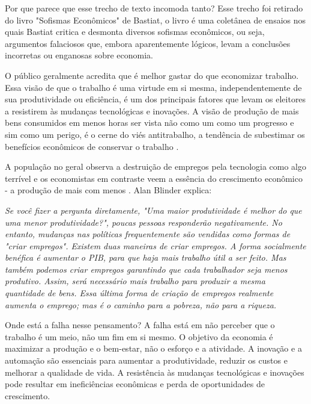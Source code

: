Por que parece que esse trecho de texto incomoda tanto? Esse trecho foi retirado do livro "Sofismas Econômicos" de Bastiat, o livro é uma coletânea de ensaios nos quais Bastiat critica e desmonta diversos sofismas econômicos, ou seja, argumentos falaciosos que, embora aparentemente lógicos, levam a conclusões incorretas ou enganosas sobre economia.

O público geralmente acredita que é melhor gastar do que economizar trabalho. Essa visão de que o trabalho é uma virtude em si mesma, independentemente de sua produtividade ou eficiência, é um dos principais fatores que levam os eleitores a resistirem às mudanças tecnológicas e inovações. A visão de produção de mais bens consumidos em menos horas ser vista não como um como um progresso e sim como um perigo, é o cerne do viés antitrabalho, a tendência de subestimar os benefícios econômicos de conservar o trabalho \cite{The_Myth_of_the_Rational_Voter}.

A população no geral observa a destruição de empregos pela tecnologia como algo terrível e os economistas em contraste veem a essência do crescimento econômico - a produção de mais com menos \cite{Myths-of-Rich-and-Poor,krugman2015accidental,davis1996job,innocence_and_design,bastiat1995selected}. Alan Blinder explica:

\begin{citacao}
    \textit{
        Se você fizer a pergunta diretamente, "Uma maior produtividade é melhor do que uma menor produtividade?", poucas pessoas responderão negativamente. No entanto, mudanças nas políticas frequentemente são vendidas como formas de "criar empregos". Existem duas maneiras de criar empregos. A forma socialmente benéfica é aumentar o PIB, para que haja mais trabalho útil a ser feito. Mas também podemos criar empregos garantindo que cada trabalhador seja menos produtivo. Assim, será necessário mais trabalho para produzir a mesma quantidade de bens. Essa última forma de criação de empregos realmente aumenta o emprego; mas é o caminho para a pobreza, não para a riqueza.
    } \newline
    \cite{blinder1987hard}
\end{citacao}

Onde está a falha nesse pensamento? A falha está em não perceber que o trabalho é um meio, não um fim em si mesmo. O objetivo da economia é maximizar a produção e o bem-estar, não o esforço e a atividade. A inovação e a automação são essenciais para aumentar a produtividade, reduzir os custos e melhorar a qualidade de vida. A resistência às mudanças tecnológicas e inovações pode resultar em ineficiências econômicas e perda de oportunidades de crescimento.

